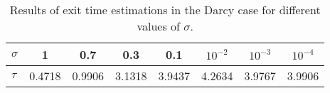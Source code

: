 \begin{table}[h]
\centering
 	\begin{tabular}{lccccccc}
	\toprule
	$\sigma$ & 1 & 0.7 & 0.3 & 0.1 & $10^{-2}$ & $10^{-3}$ & $10^{-4}$ \\
	\midrule
	$\tau$ & 0.4718 & 0.9906 & 3.1318 & 3.9437 & 4.2634 & 3.9767 & 3.9906 \\
	\bottomrule
\end{tabular}
\caption{Results of exit time estimations in the Darcy case for different values of $\sigma$.}
\label{tab:MCofMC}
\end{table}




